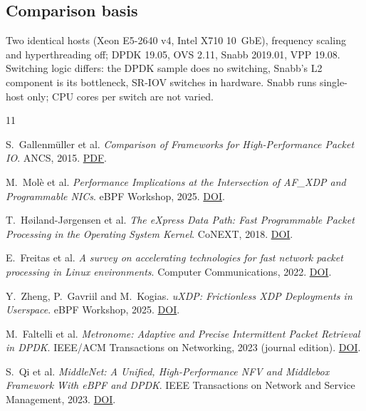 \documentclass[11pt,a4paper]{article}
\begin{document}
\subsection*{\normalsize\normalfont Comparison basis}
Two identical hosts (Xeon E5-2640 v4, Intel X710 10~GbE), frequency scaling and hyperthreading off; DPDK 19.05, OVS 2.11, Snabb 2019.01, VPP 19.08.
Switching logic differs: the DPDK sample does no switching, Snabb's L2 component is its bottleneck, SR-IOV switches in hardware.
Snabb runs single-host only; CPU cores per switch are not varied.
\par
\endgroup

\clearpage
\begin{thebibliography}{11}
\footnotesize
\setlength{\itemsep}{3pt}

S.~Gallenmüller et al.
\emph{Comparison of Frameworks for High-Performance Packet IO}.
ANCS, 2015.
\href{https://www.net.in.tum.de/fileadmin/bibtex/publications/papers/gallenmueller_ancs2015.pdf}{PDF}.

M.~Molè et al.
\emph{Performance Implications at the Intersection of AF\_XDP and Programmable NICs}.
eBPF Workshop, 2025.
\href{https://doi.org/10.1145/3748355.3748359}{DOI}.

T.~Høiland-Jørgensen et al.
\emph{The eXpress Data Path: Fast Programmable Packet Processing in the Operating System Kernel}.
CoNEXT, 2018.
\href{https://doi.org/10.1145/3281411.3281443}{DOI}.

E.~Freitas et al.
\emph{A survey on accelerating technologies for fast network packet processing in Linux environments}.
Computer Communications, 2022.
\href{https://doi.org/10.1016/j.comcom.2022.10.003}{DOI}.

Y.~Zheng, P.~Gavriil and M.~Kogias.
\emph{uXDP: Frictionless XDP Deployments in Userspace}.
eBPF Workshop, 2025.
\href{https://doi.org/10.1145/3748355.3748360}{DOI}.

M.~Faltelli et al.
\emph{Metronome: Adaptive and Precise Intermittent Packet Retrieval in DPDK}.
IEEE/ACM Transactions on Networking, 2023 (journal edition).
\href{https://doi.org/10.1109/TNET.2022.3208799}{DOI}.

S.~Qi et al.
\emph{MiddleNet: A Unified, High-Performance NFV and Middlebox Framework With eBPF and DPDK}.
IEEE Transactions on Network and Service Management, 2023.
\href{https://doi.org/10.1109/TNSM.2023.3256891}{DOI}.


\end{thebibliography}
\end{document}

